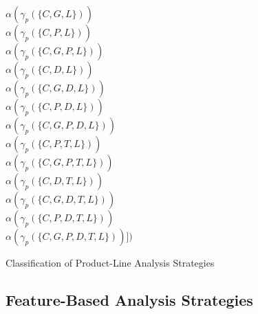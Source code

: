 \begin{frame}{\myframetitle}
\begin{mycolumns}
{{				$\alpha(\gamma_p(\{C,G,L\}))$\\
				$\alpha(\gamma_p(\{C,P,L\}))$\\
				$\alpha(\gamma_p(\{C,G,P,L\}))$\\
				$\alpha(\gamma_p(\{C,D,L\}))$\\
				$\alpha(\gamma_p(\{C,G,D,L\}))$\\
				$\alpha(\gamma_p(\{C,P,D,L\}))$\\
				$\alpha(\gamma_p(\{C,G,P,D,L\}))$\\
				$\alpha(\gamma_p(\{C,P,T,L\}))$\\
				$\alpha(\gamma_p(\{C,G,P,T,L\}))$\\
				$\alpha(\gamma_p(\{C,D,T,L\}))$\\
				$\alpha(\gamma_p(\{C,G,D,T,L\}))$\\
				$\alpha(\gamma_p(\{C,P,D,T,L\}))$\\
				$\alpha(\gamma_p(\{C,G,P,D,T,L\}))])$
			}
		}
	\end{mycolumns}
\end{frame}

\begin{frame}{Classification of Product-Line Analysis Strategies}
	\begin{mycolumns}[t,columns=3]
		\summaryproductbased
	\mynextcolumn
	\mynextcolumn
	\end{mycolumns}
\end{frame}

\subsection{Feature-Based Analysis Strategies}

\begin{frame}{\myframetitle}
	\begin{mycolumns}
		\myexampletight{}{\centering\featureDiagramLego}
	\mynextcolumn
	\end{mycolumns}
\end{frame}

